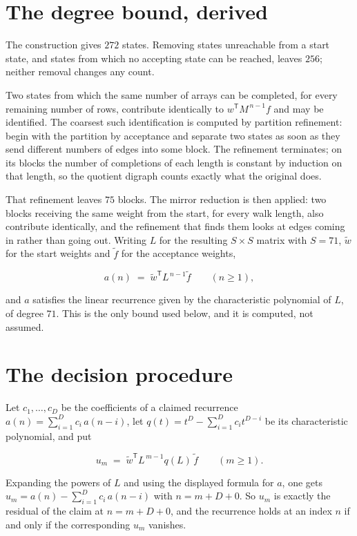 \documentclass[11pt]{article}
\theoremstyle{definition}
\begin{document}
\section{The degree bound, derived}

The construction gives $272$ states. Removing states unreachable from a start state, and states from which no accepting state can be reached, leaves $256$; neither removal changes any count.

Two states from which the same number of arrays can be completed, for every remaining number of rows, contribute identically to $w^{\mathsf T}M^{\,n-1}f$ and may be identified. The coarsest such identification is computed by partition refinement: begin with the partition by acceptance and separate two states as soon as they send different numbers of edges into some block. The refinement terminates; on its blocks the number of completions of each length is constant by induction on that length, so the quotient digraph counts exactly what the original does.

That refinement leaves $75$ blocks. The mirror reduction is then applied: two blocks receiving the same weight from the start, for every walk length, also contribute identically, and the refinement that finds them looks at edges coming in rather than going out. Writing $L$ for the resulting $S \times S$ matrix with $S = 71$, $\tilde w$ for the start weights and $\tilde f$ for the acceptance weights,

\[a(n) \;=\; \tilde w^{\mathsf T} L^{\,n-1} \tilde f \qquad (n \ge 1),\]

and $a$ satisfies the linear recurrence given by the characteristic polynomial of $L$, of degree $71$. This is the only bound used below, and it is computed, not assumed.

\section{The decision procedure}

Let $c_1,\dots,c_D$ be the coefficients of a claimed recurrence $a(n) = \sum_{i=1}^{D} c_i\,a(n-i)$, let $q(t) = t^{D} - \sum_{i=1}^{D} c_i t^{D-i}$ be its characteristic polynomial, and put

\[u_m \;=\; \tilde w^{\mathsf T} L^{\,m-1} q(L)\,\tilde f \qquad (m \ge 1).\]

Expanding the powers of $L$ and using the displayed formula for $a$, one gets $u_m = a(n) - \sum_{i=1}^{D} c_i\,a(n-i)$ with $n = m + D + 0$. So $u_m$ is exactly the residual of the claim at $n = m + D + 0$, and the recurrence holds at an index $n$ if and only if the corresponding $u_m$ vanishes.
\end{document}
